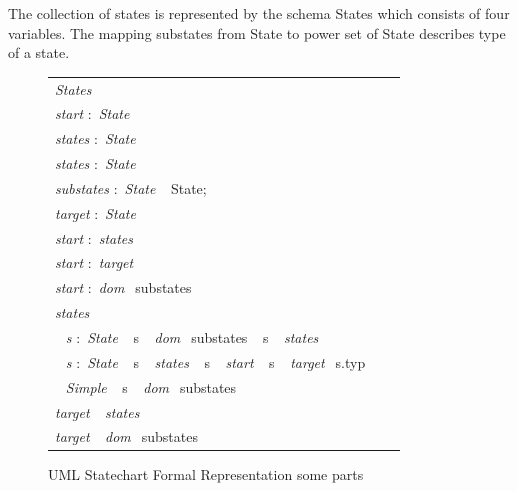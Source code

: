 The collection of states is represented by the schema
States which consists of four variables. The mapping
substates from State to power set of State describes type
of a state.
 \begin{figure}[ht!]
 	\centering
 	\begin{tabular}{lll}
 		\footnotesize                       
 		\textit{States}          \\
 		\footnotesize                       
 		\textit{start}          
 		$:$  \textit{State}\\
 		
 		\textit{states}          
 		$:$  \textit{State}\\
 		
 		\textit{states}           
 		$:$  \textit{State}\\
 		\footnotesize
 		\textit{substates}            $:$         \textit{State} $\ \  $ {State};       \\   
 		\footnotesize
 		\textit{target}             $:$         \textit{State}    \\
 		 \footnotesize                       
 		 \textit{start}           
 		 $:$  \textit{states}\\
 		  \footnotesize                       
 		  \textit{start}          
 		  $:$ \textit{target}\\
 		   \footnotesize                       
 		   \textit{start}           
 		   $:$  \textit{dom} $\ \  ${substates}\\
 		   
 		   \footnotesize                       
 		   \textit{states}          \\ 		
 		$\ \  $ \textit{s}      $:$     \textit{State} $\ \  $ {s} $\ \  $ \textit{dom} $\ \  ${substates} $\ \  $ {s} $\ \  $ \textit{states}        \\ 
 		$\ \  $ \textit{s}      $:$     \textit{State} $\ \  $ {s} $\ \  $ \textit{states} $\ \  $ {s} $\ \  $ \textit{start} $\ \  $ {s} $\ \  $ \textit{target}$\ \  $ {s.typ}\\ 
 		$\ \  $ \textit{Simple} $\ \  $ {s} $\ \  $ \textit{dom} $\ \  ${substates}\\
 		\footnotesize                       
 		\textit{target}  $\ \  $ \textit{states}        \\ 
 		\footnotesize                       
 		\textit{target}  $\ \  $ \textit{dom} $\ \  ${substates}\\	
 	\end{tabular}
 	\caption{UML Statechart Formal Representation some parts}
 	\label{statechart_formal_representation_invariants}
 	\end{figure}

